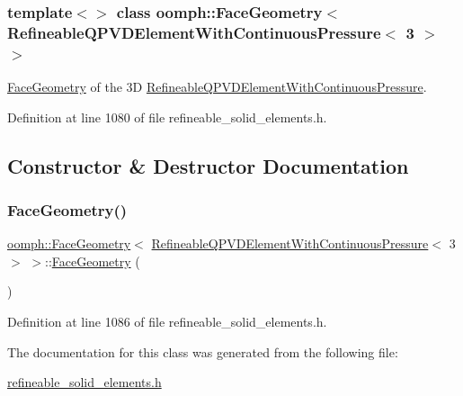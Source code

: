 \subsubsection*{template$<$$>$\newline
class oomph\+::\+Face\+Geometry$<$ Refineable\+Q\+P\+V\+D\+Element\+With\+Continuous\+Pressure$<$ 3 $>$ $>$}

\hyperlink{classoomph_1_1FaceGeometry}{Face\+Geometry} of the 3D \hyperlink{classoomph_1_1RefineableQPVDElementWithContinuousPressure}{Refineable\+Q\+P\+V\+D\+Element\+With\+Continuous\+Pressure}. 

Definition at line 1080 of file refineable\+\_\+solid\+\_\+elements.\+h.



\subsection{Constructor \& Destructor Documentation}
\mbox{\label{classoomph_1_1FaceGeometry_3_01RefineableQPVDElementWithContinuousPressure_3_013_01_4_01_4_a375ca5e8a2873c320187ed915d46de50}} 
\subsubsection{\texorpdfstring{Face\+Geometry()}{FaceGeometry()}}
{\footnotesize\ttfamily \hyperlink{classoomph_1_1FaceGeometry}{oomph\+::\+Face\+Geometry}$<$ \hyperlink{classoomph_1_1RefineableQPVDElementWithContinuousPressure}{Refineable\+Q\+P\+V\+D\+Element\+With\+Continuous\+Pressure}$<$ 3 $>$ $>$\+::\hyperlink{classoomph_1_1FaceGeometry}{Face\+Geometry} (\begin{DoxyParamCaption}{ }\end{DoxyParamCaption})\hspace{0.3cm}{\ttfamily [inline]}}



Definition at line 1086 of file refineable\+\_\+solid\+\_\+elements.\+h.



The documentation for this class was generated from the following file\+:\begin{DoxyCompactItemize}
\item 
\hyperlink{refineable__solid__elements_8h}{refineable\+\_\+solid\+\_\+elements.\+h}\end{DoxyCompactItemize}
